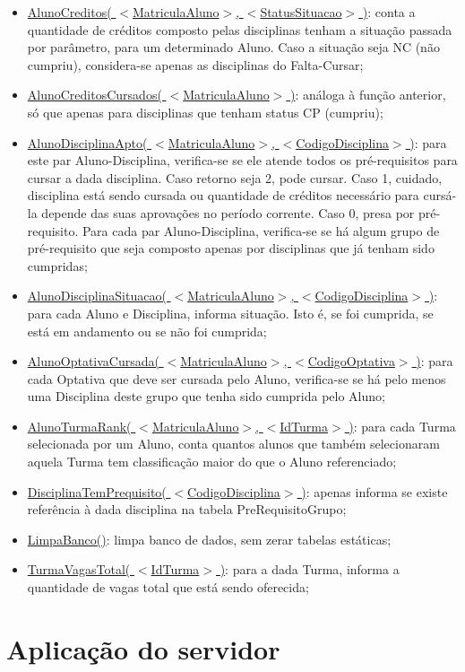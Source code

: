 \documentclass[graduacao,brazil]{ThesisPUC}
\begin{document}
\begin{itemize}
	\item \underline{AlunoCreditos( $<$MatriculaAluno$>$, $<$StatusSituacao$>$ )}: conta a quantidade de créditos composto pelas disciplinas tenham a situação passada por parâmetro, para um determinado Aluno. Caso a situação seja NC (não cumpriu), considera-se apenas as disciplinas do Falta-Cursar;
	\item \underline{AlunoCreditosCursados( $<$MatriculaAluno$>$ )}: análoga à função anterior, só que apenas para disciplinas que tenham status CP (cumpriu);
	\item \underline{AlunoDisciplinaApto( $<$MatriculaAluno$>$, $<$CodigoDisciplina$>$ )}: para este par Aluno-Disciplina, verifica-se se ele atende todos os pré-requisitos para cursar a dada disciplina. Caso retorno seja 2, pode cursar. Caso 1, cuidado, disciplina está sendo cursada ou quantidade de créditos necessário para cursá-la depende das suas aprovações no período corrente. Caso 0, presa por pré-requisito. Para cada par Aluno-Disciplina, verifica-se se há algum grupo de pré-requisito que seja composto apenas por disciplinas que já tenham sido cumpridas;
	\item \underline{AlunoDisciplinaSituacao( $<$MatriculaAluno$>$, $<$CodigoDisciplina$>$ )}: para cada Aluno e Disciplina, informa situação. Isto é, se foi cumprida, se está em andamento ou se não foi cumprida;
	\item \underline{AlunoOptativaCursada( $<$MatriculaAluno$>$, $<$CodigoOptativa$>$ )}: para cada Optativa que deve ser cursada pelo Aluno, verifica-se se há pelo menos uma Disciplina deste grupo que tenha sido cumprida pelo Aluno;
	\item \underline{AlunoTurmaRank( $<$MatriculaAluno$>$, $<$IdTurma$>$ )}: para cada Turma selecionada por um Aluno, conta quantos alunos que também selecionaram aquela Turma tem classificação maior do que o Aluno referenciado;
	\item \underline{DisciplinaTemPrequisito( $<$CodigoDisciplina$>$ )}: apenas informa se existe referência à dada disciplina na tabela PreRequisitoGrupo;
	\item \underline{LimpaBanco()}: limpa banco de dados, sem zerar tabelas estáticas;
	\item \underline{TurmaVagasTotal( $<$IdTurma$>$ )}: para a dada Turma, informa a quantidade de vagas total que está sendo oferecida;
\end{itemize}


\section{Aplicação do servidor}
\end{document}
